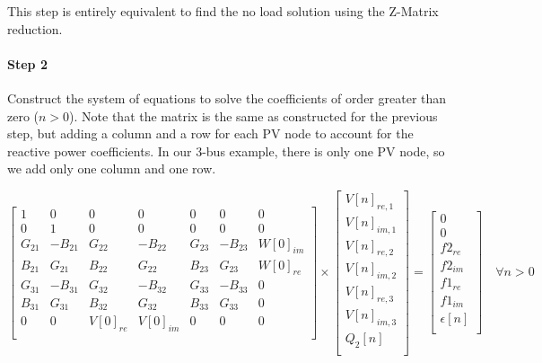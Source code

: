 \documentclass[nols,a4paper,twoside,notoc,fleqn]{tufte-book}
\begin{document}
This step is entirely equivalent to find the no load solution using the Z-Matrix reduction.

\paragraph{Step 2}

Construct the system of equations to solve the coefficients of order greater than zero ($n>0$). Note that the matrix is the same as constructed for the previous step, but adding a column and a row for each PV node to account for the reactive power coefficients. In our 3-bus example, there is only one PV node, so we add only one column and one row.

\begin{equation}
\begin{bmatrix}
1 & 0 & 0 & 0 & 0 & 0 & 0\\
0 & 1 & 0 & 0 & 0 & 0 & 0\\
G_{21} & -B_{21} & G_{22} & -B_{22} & G_{23} & -B_{23} & W[0]_{im}\\
B_{21} & G_{21}  & B_{22} & G_{22}  & B_{23} & G_{23} & W[0]_{re}\\
G_{31} & -B_{31} & G_{32} & -B_{32} & G_{33} & -B_{33} & 0\\
B_{31} & G_{31}  & B_{32} & G_{32}  & B_{33} & G_{33} & 0\\
0 & 0 & V[0]_{re} & V[0]_{im} & 0 & 0 & 0\\
\end{bmatrix}
\times
\begin{bmatrix}
V[n]_{re, 1}\\
V[n]_{im, 1}\\
V[n]_{re, 2}\\
V[n]_{im, 2}\\
V[n]_{re, 3}\\
V[n]_{im, 3}\\
Q_2[n]\\
\end{bmatrix}
=
\begin{bmatrix}
0\\
0\\
f2_{re}\\
f2_{im}\\
f1_{re}\\
f1_{im}\\
\epsilon[n]\\
\end{bmatrix}
\quad \forall n > 0
\label{lin_sys_2}
\end{equation}
\end{document}
